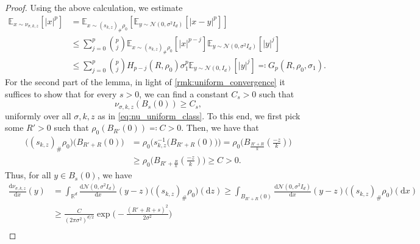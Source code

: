 \documentclass[reqno]{amsart}
\numberwithin{algorithm}{section}
\newcommand{\diff}{\mathrm{d}}
\newcommand{\R}{\mathbb{R}}
\newcommand{\EE}{{\mathbb E}}
\newcommand{\mc}[1]{\mathcal{#1}}
\begin{document}
{\begin{proof}
{        Using the above calculation, we estimate
        \begin{equation}\label{eq:nuassum_second_moment}
            \begin{split}
            \EE_{x \sim \nu_{\sigma,k,z}}[|x|^p] &= \EE_{x \sim (s_{k,z})_\# \rho_0}\left[\EE_{y \sim \mc{N}(0, \sigma^2 I_d)}[|x - y|^p]\right] \\
            &\leq \sum_{j=0}^p \binom{p}{j} \EE_{x \sim (s_{k,z})_\# \rho_0}[|x|^{p-j}] \EE_{y \sim \mc{N}(0, \sigma^2 I_d)}[|y|^j]  \\
            &\leq \sum_{j=0}^p \binom{p}{j} H_{p-j}(R, \rho_0) \sigma_1^p\EE_{y \sim \mc{N}(0, I_d)}[|y|^j] \eqqcolon G_p(R, \rho_0, \sigma_1).
            \end{split}
        \end{equation}
        }
        For the second part of the lemma, in light of \cref{rmk:uniform_convergence} it suffices to show that for every $s > 0$, we can find a constant $C_s > 0$ such that
        \begin{equation}\label{eq:nuassum_2}
            \nu_{\sigma,k,z}(B_s(0)) \geq C_s,
        \end{equation}
        uniformly over all $\sigma, k, z$ as in \cref{eq:nu_uniform_class}. To this end, we first pick some $R' > 0$ such that $\rho_0(B_{R'}(0)) \eqqcolon C > 0$. Then, we have that
        \begin{equation*}
            \begin{split}
                \Big((s_{k, z})_\# \rho_0\Big)\big(B_{R'+R}(0)\big) &= \rho_0\Big(s_{k, z}^{-1}\big(B_{R'+R}(0)\big)\Big) = \rho_0\Bigg(B_{\frac{R' + R}{k}}\left(\frac{-z}{k}\right)\Bigg) \\
                &\geq \rho_0\Bigg(B_{R' + \frac{R}{k}}\left(\frac{-z}{k}\right)\Bigg) \geq C > 0.
            \end{split}
        \end{equation*}
        Thus, for all $y \in B_s(0)$, we have
        \begin{equation*}
            \begin{split}
            \frac{\diff \nu_{\sigma,k,z}}{\diff x}(y) &= \int_{\R^d} \frac{\diff\mc{N}(0, \sigma^2 I_d)}{\diff x}(y  - z) \Big((s_{k,z})_\# \rho_0\Big)(\diff z) \geq \int_{B_{R'+R}(0)} \frac{\diff\mc{N}(0, \sigma^2 I_d)}{\diff x}(y  - z) \Big((s_{k,z})_\# \rho_0\Big)(\diff x) \\
            &\geq \frac{C}{(2\pi \sigma^2)^{d/2}} \exp\Big(-\frac{(R' + R + s)^2}{2\sigma^2}\Big) \\

\end{split}
\end{equation*}
\end{proof}}
\end{document}

